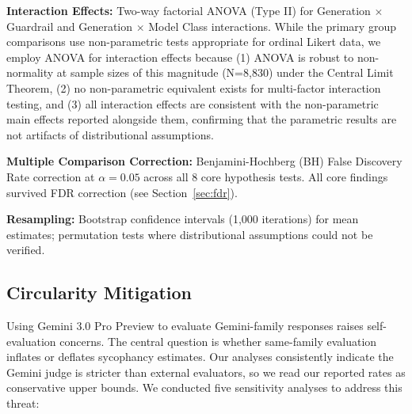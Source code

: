 \documentclass[sigconf,screen]{acmart}
\begin{document}
\textbf{Interaction Effects:} Two-way factorial ANOVA (Type II) for Generation $\times$ Guardrail and Generation $\times$ Model Class interactions. While the primary group comparisons use non-parametric tests appropriate for ordinal Likert data, we employ ANOVA for interaction effects because (1) ANOVA is robust to non-normality at sample sizes of this magnitude (N=8,830) under the Central Limit Theorem, (2) no non-parametric equivalent exists for multi-factor interaction testing, and (3) all interaction effects are consistent with the non-parametric main effects reported alongside them, confirming that the parametric results are not artifacts of distributional assumptions.

\textbf{Multiple Comparison Correction:} Benjamini-Hochberg (BH) False Discovery Rate correction at $\alpha = 0.05$ across all 8 core hypothesis tests. All core findings survived FDR correction (see Section~\ref{sec:fdr}).

\textbf{Resampling:} Bootstrap confidence intervals (1,000 iterations) for mean estimates; permutation tests where distributional assumptions could not be verified.

\subsection{Circularity Mitigation}
\label{sec:circularity}

Using Gemini 3.0 Pro Preview to evaluate Gemini-family responses raises self-evaluation concerns. The central question is whether same-family evaluation inflates or deflates sycophancy estimates. Our analyses consistently indicate the Gemini judge is stricter than external evaluators, so we read our reported rates as conservative upper bounds. We conducted five sensitivity analyses to address this threat:
\end{document}
